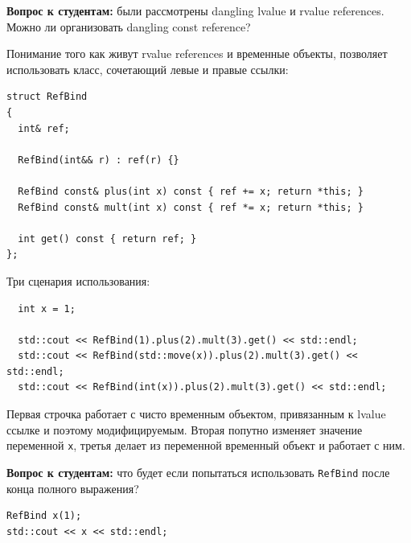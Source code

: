 \documentclass[a4paper,12pt,oneside]{article}
\newif\ifanswers
\begin{document}
\textbf{Вопрос к студентам:} были рассмотрены dangling lvalue и rvalue references. Можно ли организовать dangling const reference?

\ifanswers
Правильный ответ: тысячей способов. Из экзотики есть способ прострелить себе ногу с помощью \lstinline!initializer_list! когда он является аргументом \lstinline!new! (пример из 12.2.5 стандарта C++14): 

\begin{lstlisting}
struct S { int mi; const pair<int,int>& mp; };
S a { 1, {2,3} }; // ok
S* p = new S{ 1, {2,3} }; // Creates dangling const reference
\end{lstlisting}

Хотя вроде \lstinline!const pair&! продлевает время жизни, но new-initializer подчиняется особым правилам.
\fi

Понимание того как живут rvalue references и временные объекты, позволяет использовать класс, сочетающий левые и правые ссылки:

\begin{lstlisting}
struct RefBind
{
  int& ref;

  RefBind(int&& r) : ref(r) {}

  RefBind const& plus(int x) const { ref += x; return *this; }
  RefBind const& mult(int x) const { ref *= x; return *this; }

  int get() const { return ref; }
};
\end{lstlisting}

Три сценария использования:

\begin{lstlisting}
  int x = 1;

  std::cout << RefBind(1).plus(2).mult(3).get() << std::endl;
  std::cout << RefBind(std::move(x)).plus(2).mult(3).get() << std::endl;
  std::cout << RefBind(int(x)).plus(2).mult(3).get() << std::endl;
\end{lstlisting}

Первая строчка работает с чисто временным объектом, привязанным к lvalue ссылке и поэтому модифицируемым. Вторая попутно изменяет значение переменной \lstinline!x!, третья делает из переменной временный объект и работает с ним.

\textbf{Вопрос к студентам:} что будет если попытаться использовать \lstinline!RefBind! после конца полного выражения?

\begin{lstlisting}
RefBind x(1);
std::cout << x << std::endl;
\end{lstlisting}
\end{document}
